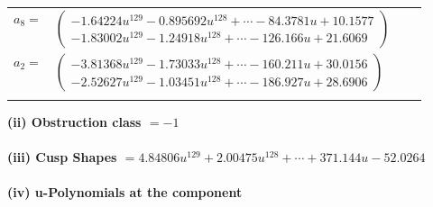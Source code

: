 \documentclass[1p]{elsarticle_modified}
\theoremstyle{definition}
\begin{document}
\begin{tabular}{m{7pt} m{180pt} m{7pt} m{180pt} }
\flushright $a_{8}=$&$\begin{pmatrix}-1.64224 u^{129}-0.895692 u^{128}+\cdots-84.3781 u+10.1577\\-1.83002 u^{129}-1.24918 u^{128}+\cdots-126.166 u+21.6069\end{pmatrix}$ \\
\flushright $a_{2}=$&$\begin{pmatrix}-3.81368 u^{129}-1.73033 u^{128}+\cdots-160.211 u+30.0156\\-2.52627 u^{129}-1.03451 u^{128}+\cdots-186.927 u+28.6906\end{pmatrix}$\\&\end{tabular}
\flushleft \textbf{(ii) Obstruction class $= -1$}\\~\\
\flushleft \textbf{(iii) Cusp Shapes $= 4.84806 u^{129}+2.00475 u^{128}+\cdots+371.144 u-52.0264$}\\~\\
\newpage\renewcommand{\arraystretch}{1}
\flushleft \textbf{(iv) u-Polynomials at the component}\newline \\
\end{document}
